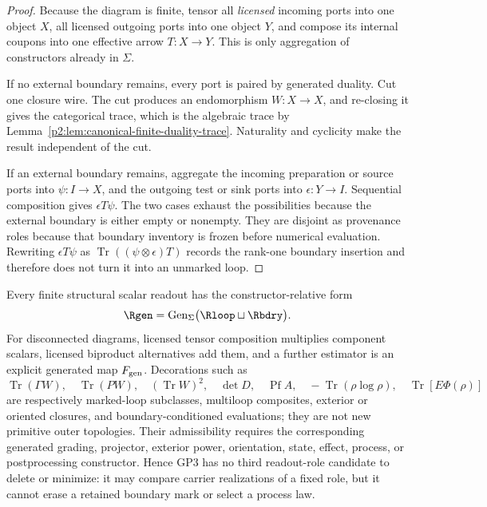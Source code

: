 \documentclass[12pt,a4paper]{article}
\begin{document}
\begin{proof}
Because the diagram is finite, tensor all \emph{licensed} incoming ports into
one object \(X\), all licensed outgoing ports into one object \(Y\), and
compose its internal coupons into one effective arrow \(T:X\to Y\).  This is
only aggregation of constructors already in \(\Sigma\).

If no external boundary remains, every port is paired by generated duality.
Cut one closure wire.  The cut produces an endomorphism \(W:X\to X\), and
re-closing it gives the categorical trace, which is the algebraic trace by
Lemma~\ref{p2:lem:canonical-finite-duality-trace}.  Naturality and cyclicity
make the result independent of the cut.

If an external boundary remains, aggregate the incoming preparation or source
ports into \(\psi:I\to X\), and the outgoing test or sink ports into
\(\epsilon:Y\to I\).  Sequential composition gives \(\epsilon T\psi\).
The two cases exhaust the possibilities because the external boundary is
either empty or nonempty.  They are disjoint as provenance roles because that
boundary inventory is frozen before numerical evaluation.  Rewriting
\(\epsilon T\psi\) as
\(\operatorname{Tr}((\psi\otimes\epsilon)T)\) records the rank-one boundary
insertion and therefore does not turn it into an unmarked loop.
\end{proof}

\begin{corollary}
\label{p2:cor:generated-readout-closure}
Every finite structural scalar readout has the constructor-relative form
\[
 \Rgen
 =\operatorname{Gen}_{\Sigma}
 \bigl(\Rloop\sqcup\Rbdry\bigr).
\]
For disconnected diagrams, licensed tensor composition multiplies component
scalars, licensed biproduct alternatives add them, and a further estimator is
an explicit generated map \(F_{\rm gen}\).  Decorations such as
\[
 \operatorname{Tr}(\Gamma W),\quad
 \operatorname{Tr}(PW),\quad
 (\operatorname{Tr}W)^2,\quad
 \det D,\quad \operatorname{Pf}A,\quad
 -\operatorname{Tr}(\rho\log\rho),\quad
 \operatorname{Tr}[E\Phi(\rho)]
\]
are respectively marked-loop subclasses, multiloop composites, exterior or
oriented closures, and boundary-conditioned evaluations; they are not new
primitive outer topologies.  Their admissibility requires the corresponding
generated grading, projector, exterior power, orientation, state, effect,
process, or postprocessing constructor.  Hence GP3 has no third readout-role
candidate to delete or minimize: it may compare carrier realizations of a
fixed role, but it cannot erase a retained boundary mark or select a process
law.
\end{corollary}
\end{document}
